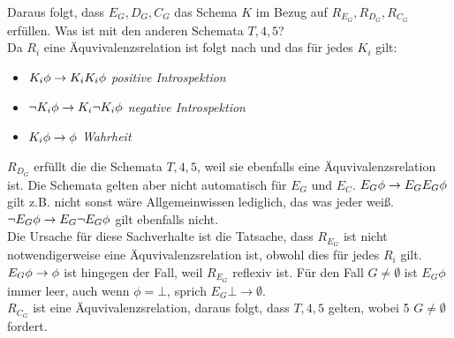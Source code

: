 Daraus folgt, dass $E_G, D_G, C_G$ das Schema $K$ im Bezug auf $R_{E_G}, R_{D_G}, R_{C_G}$ erfüllen.
Was ist mit den anderen Schemata $T,4,5$?\\
Da $R_i$ eine Äquvivalenzsrelation ist folgt nach  und   das für jedes $K_i$ gilt:
\begin{itemize}
	\item $K_i \phi \rightarrow K_i K_i \phi$ \emph{positive Introspektion}
	\item $\neg K_i \phi \rightarrow K_i \neg K_i \phi$ \emph{negative Introspektion}
	\item $K_i \phi \rightarrow \phi$ \emph{Wahrheit}
\end{itemize}

$R_{D_G}$ erfüllt die die Schemata $T,4,5$, weil sie ebenfalls eine Äquvivalenzsrelation ist.
Die Schemata gelten aber nicht automatisch für $E_G$ und $E_C$.
$E_G \phi \rightarrow E_G E_G \phi$ gilt z.B. nicht sonst wäre Allgemeinwissen lediglich, das was jeder weiß.
$\neg E_G \phi \rightarrow E_G \neg E_G \phi$ gilt ebenfalls nicht.\\
Die Ursache für diese Sachverhalte ist die Tatsache, dass $R_{E_G}$ ist nicht notwendigerweise eine Äquvivalenzsrelation ist, obwohl dies für jedes $R_i$ gilt.\\
$E_G \phi \rightarrow \phi$ ist hingegen der Fall, weil $R_{E_G}$ reflexiv ist.
Für den Fall $G \neq \emptyset$ ist $E_G \phi$ immer leer, auch wenn $\phi = \bot$, sprich $E_G \bot \rightarrow \emptyset$.\\
$R_{C_{G}}$ ist eine Äquvivalenzsrelation, daraus folgt, dass $T,4,5$ gelten, wobei 5 $G \neq \emptyset$ fordert.





